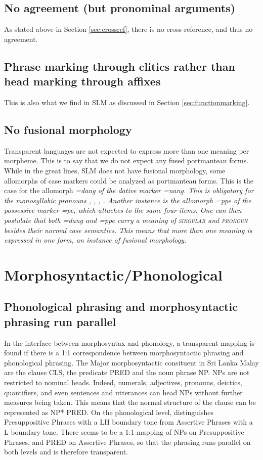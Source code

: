 \documentclass[a4paper]{article}
\begin{document}
\subsection{No agreement (but pronominal arguments)}
As stated above in Section \ref{sec:crossref}, there is no cross-reference, and thus no agreement.

\subsection{Phrase marking through clitics rather than head marking through affixes}
This is also what we find in SLM as discussed in Section \ref{sec:functionmarking}.

\subsection{No fusional morphology}
Transparent languages are not expected to express more than one meaning per morpheme. This is to say that we do not expect any fused portmanteau forms. While in the great lines, SLM does not have fusional morphology, some allomorphs of case markers could be analyzed as portmanteau forms. This is the case for the allomorph \em =dang \em of the dative marker \em =nang\em. This is obligatory for the monosyllabic pronouns , , , . Another instance is the allomorph \em =ppe \em of the possessive marker \em =pe\em, which attaches to the same four items. One can then postulate that both \em =dang \em and \em =ppe \em carry a meaning of \textsc{singular} and \textsc{pronoun} besides their normal case semantics. This means that more than one meaning is expressed in one form, an instance of fusional morphology.

\section{Morphosyntactic/Phonological}
\subsection{Phonological phrasing and morphosyntactic phrasing run parallel}
In the interface between morphosyntax and phonology, a transparent mapping is found if there is a 1:1 correspondence between morphosyntactic phrasing and phonological phrasing. The Major morphosyntactic consituent in Sri Lanka Malay are the clause CLS, the predicate PRED and the noun phrase NP. NPs are not restricted to nominal heads. Indeed, numerals, adjectives, pronouns, deictics, quantifiers, and even sentences and utterances can head NPs without further measures being taken. This means that the normal structure of the clause can be represented as  NP* PRED. On the phonological level, \citet{Nordhoff2009phd} distinguishes Presuppositive Phrases with a LH boundary tone from Assertive Phrases with a L boundary tone. There seems to be a 1:1 mapping of NPs on Presuppositive Phrases, and PRED on Assertive Phrases, so that the phrasing runs parallel on both levels and is therefore transparent.
\end{document}
